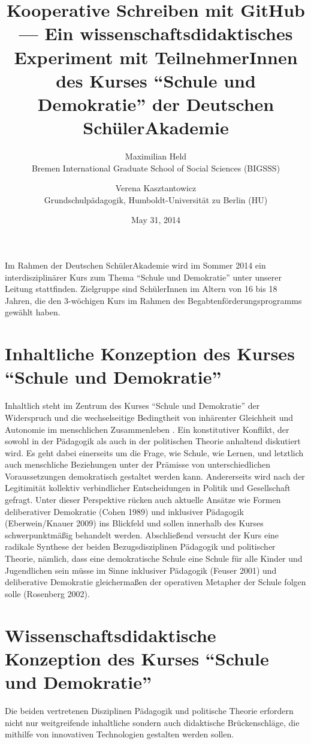 \documentclass[11pt,a4paper,oneside]{article}
\title{
	Kooperative Schreiben mit GitHub ---
	Ein wissenschaftsdidaktisches Experiment mit TeilnehmerInnen des Kurses ``Schule und Demokratie'' der Deutschen SchülerAkademie
}
\date{May 31, 2014}
\author{
	Maximilian Held\\
	Bremen International Graduate School of Social Sciences (BIGSSS)
	\and
	Verena Kasztantowicz\\
	Grundschulpädagogik, Humboldt-Universität zu Berlin (HU)
}
\begin{document}
\maketitle

Im Rahmen der Deutschen SchülerAkademie wird im Sommer 2014 ein interdisziplinärer Kurs zum Thema ``Schule und Demokratie'' unter unserer Leitung stattfinden.
Zielgruppe sind SchülerInnen im Altern von 16 bis 18 Jahren, die den 3-wöchigen Kurs im Rahmen des Begabtenförderungsprogramms gewählt haben.

\section{Inhaltliche Konzeption des Kurses ``Schule und Demokratie''}

Inhaltlich steht im Zentrum des Kurses ``Schule und Demokratie'' der Widerspruch und die wechselseitige Bedingtheit von inhärenter Gleichheit und Autonomie im menschlichen Zusammenleben \cite{Habermas1999a}.
Ein konstitutiver Konflikt, der sowohl in der Pädagogik als auch in der politischen Theorie anhaltend diskutiert wird.
Es geht dabei einerseits um die Frage, wie Schule, wie Lernen, und letztlich auch menschliche Beziehungen unter der Prämisse von unterschiedlichen Voraussetzungen demokratisch gestaltet werden kann.
Andererseits wird nach der Legitimität kollektiv verbindlicher Entscheidungen in Politik und Gesellschaft gefragt.
Unter dieser Perspektive rücken auch aktuelle Ansätze wie Formen deliberativer Demokratie (Cohen 1989) und inklusiver Pädagogik (Eberwein/Knauer 2009) ins Blickfeld und sollen innerhalb des Kurses schwerpunktmäßig behandelt werden.
Abschließend versucht der Kurs eine radikale Synthese der beiden Bezugsdisziplinen Pädagogik und politischer Theorie, nämlich, dass eine demokratische Schule eine Schule für alle Kinder und Jugendlichen sein müsse im Sinne inklusiver Pädagogik (Feuser 2001) und deliberative Demokratie gleichermaßen der operativen Metapher der Schule folgen solle (Rosenberg 2002).

\section{Wissenschaftsdidaktische Konzeption des Kurses ``Schule und Demokratie''}

Die beiden vertretenen Disziplinen Pädagogik und politische Theorie erfordern nicht nur weitgreifende inhaltliche sondern auch didaktische Brückenschläge, die mithilfe von innovativen Technologien gestalten werden sollen.
\end{document}
